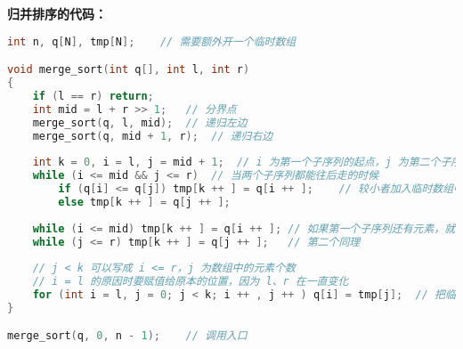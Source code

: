 \textbf{归并排序的代码：}
\begin{lstlisting}[language=cpp]
int n, q[N], tmp[N];    // 需要额外开一个临时数组

void merge_sort(int q[], int l, int r)
{
    if (l == r) return;
    int mid = l + r >> 1;   // 分界点
    merge_sort(q, l, mid);  // 递归左边
    merge_sort(q, mid + 1, r);  // 递归右边
    
    int k = 0, i = l, j = mid + 1;  // i 为第一个子序列的起点，j 为第二个子序列的起点
    while (i <= mid && j <= r)  // 当两个子序列都能往后走的时候
        if (q[i] <= q[j]) tmp[k ++ ] = q[i ++ ];    // 较小者加入临时数组中
        else tmp[k ++ ] = q[j ++ ];
    
    while (i <= mid) tmp[k ++ ] = q[i ++ ]; // 如果第一个子序列还有元素，就直接加
    while (j <= r) tmp[k ++ ] = q[j ++ ];   // 第二个同理
    
    // j < k 可以写成 i <= r，j 为数组中的元素个数
    // i = l 的原因时要赋值给原本的位置，因为 l、r 在一直变化
    for (int i = l, j = 0; j < k; i ++ , j ++ ) q[i] = tmp[j];  // 把临时数组赋值给原数组
}

merge_sort(q, 0, n - 1);    // 调用入口

\end{lstlisting}